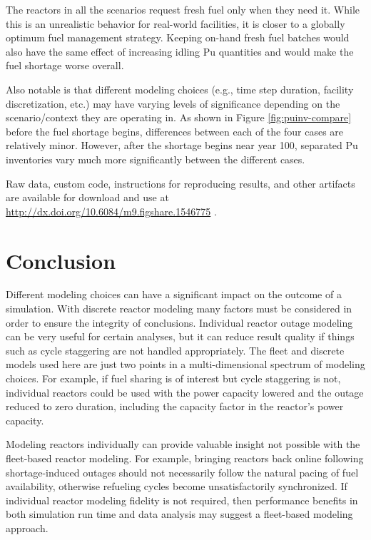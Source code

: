 \documentclass{style}
\begin{document}
The reactors in all the scenarios request fresh fuel only when they need it.
While this is an unrealistic behavior for real-world facilities, it is closer
to a globally optimum fuel management strategy.  Keeping on-hand fresh fuel
batches would also have the same effect of increasing idling Pu
quantities and would make the fuel shortage worse overall.

Also notable is that different modeling choices (e.g., time step duration,
facility discretization, etc.) may have varying levels of significance
depending on the scenario/context they are operating in.  As shown in Figure
\ref{fig:puinv-compare} before the fuel shortage begins, differences between
each of the four cases are relatively minor.  However, after the shortage
begins near year 100, separated Pu inventories vary much more significantly
between the different cases.

Raw data, custom code, instructions for reproducing results, and other
artifacts are available for download and use at
\url{http://dx.doi.org/10.6084/m9.figshare.1546775} \cite{Carlsen2015}.

\section{Conclusion}

Different modeling choices can have a significant impact on the outcome of a
simulation.  With discrete reactor modeling many factors must be considered in
order to ensure the integrity of conclusions.  Individual reactor outage
modeling can be very useful for certain analyses, but it can reduce result
quality if things such as cycle staggering are not handled appropriately.  The
fleet and discrete models used here are just two points in a multi-dimensional
spectrum of modeling choices. For example, if fuel sharing is of interest but cycle
staggering is not, individual reactors could be used with the power capacity
lowered and the outage reduced to zero duration, including the capacity factor
in the reactor's power capacity.

Modeling reactors individually can provide valuable insight not possible with
the fleet-based reactor modeling.  For example, bringing reactors back online
following shortage-induced outages should not necessarily follow the natural
pacing of fuel availability, otherwise refueling cycles become
unsatisfactorily synchronized.  If individual reactor modeling fidelity is not
required, then performance benefits in both simulation run time and data
analysis may suggest a fleet-based modeling approach.
\end{document}

